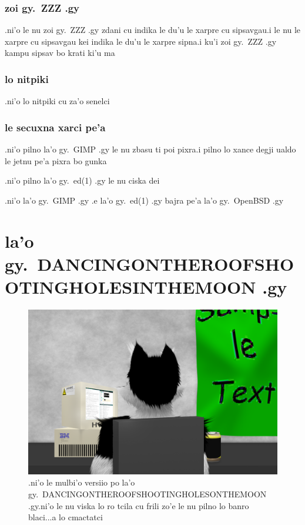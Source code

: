 \documentclass{report}
\begin{document}
\subsection{zoi gy.\ ZZZ .gy}
.ni'o le nu zoi gy.\ ZZZ .gy zdani cu indika le du'u le xarpre cu sipsavgau\@  .i le nu le xarpre cu sipsavgau kei indika le du'u le xarpre sipna\@  .i ku'i zoi gy.\ ZZZ .gy kampu sipsav bo krati ki'u ma
\subsection{lo nitpiki}
.ni'o lo nitpiki cu za'o senelci
\subsection{le secuxna xarci pe'a}
.ni'o pilno la'o gy.\ GIMP .gy le nu zbasu ti poi pixra\@  .i pilno lo xance degji ualdo le jetnu pe'a pixra bo gunka

.ni'o pilno la'o gy.\ ed(1) .gy le nu ciska dei

.ni'o la'o gy.\ GIMP .gy .e la'o gy.\ ed(1) .gy bajra pe'a la'o gy.\ OpenBSD .gy
\chapter{la'o gy.\ DANCINGONTHEROOFSHOOTINGHOLESINTHEMOON .gy}
\begin{figure}[ht]
	\centering
	\includegraphics[width=\textwidth]{dancingontheroofshootingholesinthemoon/dancingontheroofshootingholesinthemoon.png}
	\caption[center]{.ni'o le mulbi'o versiio po la'o gy.\ DANCINGONTHEROOFSHOOTINGHOLESONTHEMOON .gy\@  .ni'o le nu viska lo ro tcila cu frili zo'e le nu pilno lo banro blaci...a lo cmactatci}
\end{figure}
\end{document}
